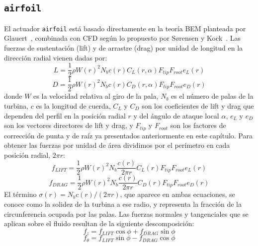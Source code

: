 \subsection{\texttt{airfoil} \checkmark}
El actuador \texttt{airfoil} está basado directamente en la teoría BEM planteada por Glauert~\citep{glauert1935}, combinada con CFD según lo propuesto por Sørensen y Kock~\citep{sorensen1995}. Las fuerzas de sustentación (lift) y de arrastre (drag) por unidad de longitud en la dirección radial vienen dadas por:
\begin{equation}
L = \frac{1}{2}\rho W(r)^2 N_b c(r) C_L(r,\alpha) F_{tip} F_{root} e_L(r)
\label{eq:AD_airfoil_lift}
\end{equation}
\begin{equation}
D = \frac{1}{2}\rho W(r)^2 N_b c(r) C_D(r,\alpha) F_{tip} F_{root} e_D(r)
\label{eq:AD_airfoil_drag}
\end{equation}
donde $W$ es la velocidad relativa al giro de la pala, $N_b$ es el número de palas de la turbina, $c$ es la longitud de cuerda, $C_L$ y $C_D$ son los coeficientes de lift y drag que dependen del perfil en la posición radial $r$ y del ángulo de ataque local $\alpha$, $e_L$ y $e_D$ son los vectores directores de lift y drag, y $F_{tip}$ y $F_{root}$ son los factores de corrección de punta y de raíz ya presentados anteriormente en este capítulo. Para obtener las fuerzas por unidad de área dividimos por el perímetro en cada posición radial, $2\pi r$:
\begin{equation}
f_{LIFT} = \frac{1}{2}\rho W(r)^2 N_b \frac{c(r)}{2\pi r} C_L(r) F_{tip} F_{root} e_L(r)
\label{eq:AD_airfoil_flift}
\end{equation}
\begin{equation}
f_{DRAG} = \frac{1}{2}\rho W(r)^2 N_b \frac{c(r)}{2\pi r} C_D(r) F_{tip} F_{root} e_D(r)
\label{eq:AD_airfoil_fdrag}
\end{equation}
El término $\sigma(r) = N_b c(r)/(2\pi r)$, que aparece en ambas ecuaciones, se conoce como la solidez de la turbina a ese radio, y representa la fracción de la circunferencia ocupada por las palas. Las fuerzas normales y tangenciales que se aplican sobre el fluido resultan de la siguiente descomposición:
\begin{equation}
f_z = f_{LIFT}\cos\phi + f_{DRAG}\sin\phi
\label{eq:AD_airfoil_fz}
\end{equation}
\begin{equation}
f_\theta = f_{LIFT}\sin\phi - f_{DRAG}\cos\phi
\label{eq:AD_airfoil_ftheta}
\end{equation}
